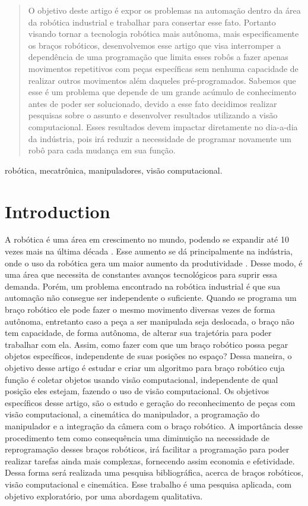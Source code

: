\documentclass[conference]{IEEEtran}
\begin{document}
\begin{abstract}
O objetivo deste artigo é expor os problemas na automação dentro da área da robótica industrial e trabalhar para consertar esse fato. Portanto visando tornar a tecnologia robótica mais autônoma, mais especificamente os braços robóticos, desenvolvemos esse artigo que visa interromper a dependência de uma programação que limita esses robôs a fazer apenas movimentos repetitivos com peças específicas sem nenhuma capacidade de realizar outros movimentos além daqueles pré-programados. Sabemos que esse é um problema que depende de um grande acúmulo de conhecimento antes de poder ser solucionado, devido a esse fato decidimos realizar pesquisas sobre o assunto e desenvolver resultados utilizando a visão computacional. Esses resultados devem impactar diretamente no dia-a-dia da indústria, pois irá reduzir a necessidade de programar novamente um robô para cada mudança em sua função.
\end{abstract}

\begin{IEEEkeywords}
robótica, mecatrônica, manipuladores, visão computacional.
\end{IEEEkeywords}

\section{Introduction}

A robótica é uma área em crescimento no mundo, podendo se expandir até 10 vezes mais na última década \cite{Roboticonline}. Esse aumento se dá principalmente na indústria, onde o uso da robótica gera um maior aumento da produtividade \cite{robotica1}. Desse modo, é uma área que necessita de constantes avanços tecnológicos para suprir essa demanda. Porém, um problema encontrado na robótica industrial é que sua automação não consegue ser independente o suficiente. Quando se programa um braço robótico ele pode fazer o mesmo movimento diversas vezes de forma autônoma, entretanto caso a peça a ser manipulada seja deslocada, o braço não tem capacidade, de forma autônoma, de alterar sua trajetória para poder trabalhar com ela. Assim, como fazer com que um braço robótico possa pegar objetos específicos, independente de suas posições no espaço? Dessa maneira, o objetivo desse artigo é estudar e criar um algoritmo para braço robótico cuja função é coletar objetos usando visão computacional, independente de qual posição eles estejam, fazendo o uso de visão computacional. Os objetivos específicos desse artigo, são o estudo e geração do reconhecimento de peças com visão computacional, a cinemática do manipulador, a programação do manipulador e a integração da câmera com o braço robótico.  A importância desse procedimento tem como consequência uma diminuição na necessidade de reprogramação desses braços robóticos, irá facilitar a programação para poder realizar tarefas ainda mais complexas, fornecendo assim economia e efetividade. Dessa forma será realizada uma pesquisa bibliográfica, acerca de braços robóticos, visão computacional e cinemática. Esse trabalho é uma pesquisa aplicada, com objetivo exploratório, por uma abordagem qualitativa.
\end{document}
